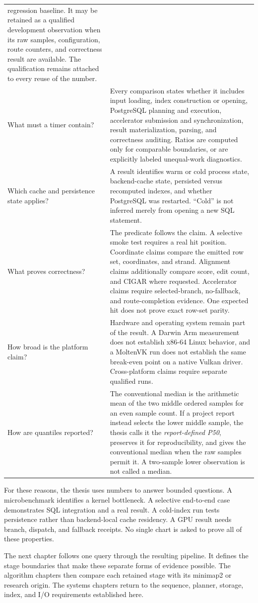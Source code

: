 \begin{table}[H]
\begin{tabularx}{\linewidth}{p{.23\linewidth}X}
    regression baseline. It may be retained as a qualified development
    observation when its raw samples, configuration, route counters, and
    correctness result are available. The qualification remains attached to
    every reuse of the number. \\
    What must a timer contain? &
    Every comparison states whether it includes input loading, index
    construction or opening, PostgreSQL planning and execution, accelerator
    submission and synchronization, result materialization, parsing, and
    correctness auditing. Ratios are computed only for comparable boundaries,
    or are explicitly labeled unequal-work diagnostics. \\
    Which cache and persistence state applies? &
    A result identifies warm or cold process state, backend-cache state,
    persisted versus recomputed indexes, and whether PostgreSQL was restarted.
    ``Cold'' is not inferred merely from opening a new SQL statement. \\
    What proves correctness? &
    The predicate follows the claim. A selective smoke test requires a real
    hit position. Coordinate claims compare the emitted row set, coordinates,
    and strand. Alignment claims additionally compare score, edit count, and
    CIGAR where requested. Accelerator claims require selected-branch,
    no-fallback, and route-completion evidence. One expected hit does not prove
    exact row-set parity. \\
    How broad is the platform claim? &
    Hardware and operating system remain part of the result. A Darwin Arm
    measurement does not establish x86-64 Linux behavior, and a MoltenVK run
    does not establish the same break-even point on a native Vulkan driver.
    Cross-platform claims require separate qualified runs. \\
    How are quantiles reported? &
    The conventional median is the arithmetic mean of the two middle ordered
    samples for an even sample count. If a project report instead selects the
    lower middle sample, the thesis calls it the
    \emph{report-defined P50}, preserves it for reproducibility, and gives the
    conventional median when the raw samples permit it. A two-sample lower
    observation is not called a median. \\
    \bottomrule
  \end{tabularx}
\end{table}

For these reasons, the thesis uses numbers to answer bounded questions.
A microbenchmark identifies a kernel bottleneck.  A selective end-to-end
case demonstrates SQL integration and a real result.  A cold-index run
tests persistence rather than backend-local cache residency.  A GPU
result needs branch, dispatch, and fallback receipts.  No single chart is
asked to prove all of these properties.

The next chapter follows one query through the resulting pipeline.  It
defines the stage boundaries that make these separate forms of evidence
possible.  The algorithm chapters then compare each retained stage with
its minimap2 or research origin.  The systems chapters return to the
sequence, planner, storage, index, and I/O requirements established here.
